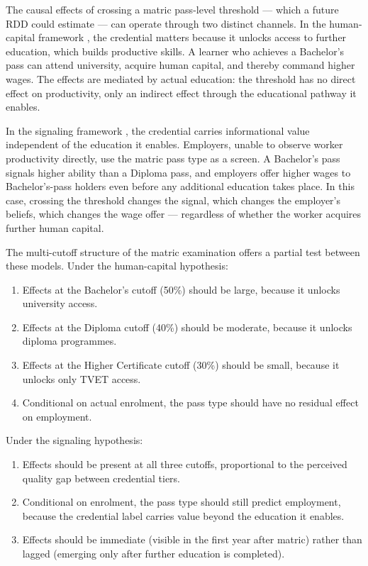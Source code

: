 \documentclass[12pt]{article}
\begin{document}
The causal effects of crossing a matric pass-level threshold --- which a future RDD could estimate --- can operate through two distinct channels. In the human-capital framework \citep{becker1964human, mincer1974schooling}, the credential matters because it unlocks access to further education, which builds productive skills. A learner who achieves a Bachelor's pass can attend university, acquire human capital, and thereby command higher wages. The effects are mediated by actual education: the threshold has no direct effect on productivity, only an indirect effect through the educational pathway it enables.

In the signaling framework \citep{spence1973job}, the credential carries informational value independent of the education it enables. Employers, unable to observe worker productivity directly, use the matric pass type as a screen. A Bachelor's pass signals higher ability than a Diploma pass, and employers offer higher wages to Bachelor's-pass holders even before any additional education takes place. In this case, crossing the threshold changes the signal, which changes the employer's beliefs, which changes the wage offer --- regardless of whether the worker acquires further human capital.

The multi-cutoff structure of the matric examination offers a partial test between these models. Under the human-capital hypothesis:
\begin{enumerate}
    \item Effects at the Bachelor's cutoff (50\%) should be large, because it unlocks university access.
    \item Effects at the Diploma cutoff (40\%) should be moderate, because it unlocks diploma programmes.
    \item Effects at the Higher Certificate cutoff (30\%) should be small, because it unlocks only TVET access.
    \item Conditional on actual enrolment, the pass type should have no residual effect on employment.
\end{enumerate}

Under the signaling hypothesis:
\begin{enumerate}
    \item Effects should be present at all three cutoffs, proportional to the perceived quality gap between credential tiers.
    \item Conditional on enrolment, the pass type should still predict employment, because the credential label carries value beyond the education it enables.
    \item Effects should be immediate (visible in the first year after matric) rather than lagged (emerging only after further education is completed).
\end{enumerate}
\end{document}

